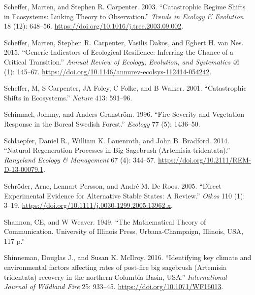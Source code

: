 \documentclass[
  12pt,
]{article}
\newlength{\cslhangindent}
\newlength{\cslentryspacingunit} %
\newenvironment{CSLReferences}[2] %
 {%
  \setlength{\parindent}{0pt}
  \ifodd #1
  \let\oldpar\par
  \def\par{\hangindent=\cslhangindent\oldpar}
  \fi
  \setlength{\parskip}{#2\cslentryspacingunit}
 }%
 {}
\begin{document}
\begin{CSLReferences}{1}{0}
\leavevmode{}%
Scheffer, Marten, and Stephen R. Carpenter. 2003. {``Catastrophic Regime
Shifts in Ecosystems: Linking Theory to Observation.''} \emph{Trends in
Ecology \& Evolution} 18 (12): 648--56.
\url{https://doi.org/10.1016/j.tree.2003.09.002}.

\leavevmode{}%
Scheffer, Marten, Stephen R. Carpenter, Vasilis Dakos, and Egbert H. van
Nes. 2015. {``Generic {Indicators} of {Ecological} {Resilience}:
{Inferring} the {Chance} of a {Critical} {Transition}.''} \emph{Annual
Review of Ecology, Evolution, and Systematics} 46 (1): 145--67.
\url{https://doi.org/10.1146/annurev-ecolsys-112414-054242}.

\leavevmode{}%
Scheffer, M, S Carpenter, JA Foley, C Folke, and B Walker. 2001.
{``Catastrophic Shifts in Ecosystems.''} \emph{Nature} 413: 591--96.

\leavevmode{}%
Schimmel, Johnny, and Anders Granström. 1996. {``{Fire Severity and
Vegetation Response in the Boreal Swedish Forest}.''} \emph{Ecology} 77
(5): 1436--50.

\leavevmode{}%
Schlaepfer, Daniel R., William K. Lauenroth, and John B. Bradford. 2014.
{``{Natural Regeneration Processes in Big Sagebrush (Artemisia
tridentata)}.''} \emph{Rangeland Ecology \& Management} 67 (4): 344--57.
\url{https://doi.org/10.2111/REM-D-13-00079.1}.

\leavevmode{}%
Schröder, Arne, Lennart Persson, and André M. De Roos. 2005. {``Direct
Experimental Evidence for Alternative Stable States: {A} Review.''}
\emph{Oikos} 110 (1): 3--19.
\url{https://doi.org/10.1111/j.0030-1299.2005.13962.x}.

\leavevmode{}%
Shannon, CE, and W Weaver. 1949. {``The Mathematical Theory of
Communication. University of Illinois Press, Urbana-Champaign, Illinois,
USA, 117 p.''}

\leavevmode{}%
Shinneman, Douglas J., and Susan K. McIlroy. 2016. {``{Identifying key
climate and environmental factors affecting rates of post-fire big
sagebrush (Artemisia tridentata) recovery in the northern Columbia
Basin, USA}.''} \emph{International Journal of Wildland Fire} 25:
933--45. \url{https://doi.org/10.1071/WF16013}.


\end{CSLReferences}
\end{document}
